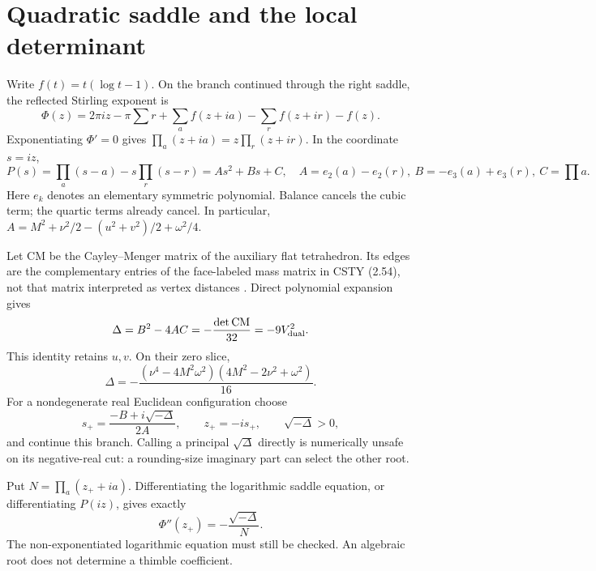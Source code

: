 \documentclass[11pt,a4paper]{article}
\begin{document}
\section{Quadratic saddle and the local determinant}
Write \(f(t)=t(\log t-1)\). On the branch continued through the right
saddle, the reflected Stirling exponent is
\begin{equation}
 \Phi(z)=2\pi iz-\pi\sum r+
 \sum_a f(z+ia)-\sum_r f(z+ir)-f(z).
 \label{eq:phi}
\end{equation}
Exponentiating \(\Phi'=0\) gives
\(\prod_a(z+ia)=z\prod_r(z+ir)\). In the coordinate \(s=iz\),
\begin{equation}
 P(s)=\prod_a(s-a)-s\prod_r(s-r)=As^2+Bs+C,\quad
 A=e_2(a)-e_2(r),\ B=-e_3(a)+e_3(r),\ C=\prod a.
 \label{eq:poly}
\end{equation}
Here \(e_k\) denotes an elementary symmetric polynomial. Balance
cancels the cubic term; the quartic terms already cancel. In particular,
\(A=M^2+\nu^2/2-(u^2+v^2)/2+\omega^2/4\).

Let \(\mathrm{CM}\) be the Cayley--Menger matrix of the auxiliary
flat tetrahedron. Its edges are the complementary entries of the
face-labeled mass matrix in CSTY (2.54), not that matrix interpreted
as vertex distances \cite{CSTY}. Direct polynomial expansion gives
\begin{equation}
 \Delta=B^2-4AC=-\frac{\det\mathrm{CM}}{32}
              =-9V_{\rm dual}^2.
 \label{eq:CM}
\end{equation}
This identity retains \(u,v\). On their zero slice,
\begin{equation}
 \Delta=-\frac{(\nu^4-4M^2\omega^2)
                    (4M^2-2\nu^2+\omega^2)}{16}.
 \label{eq:delta}
\end{equation}
For a nondegenerate real Euclidean configuration choose
\[
 s_+=\frac{-B+i\sqrt{-\Delta}}{2A},\qquad z_+=-is_+,
 \qquad \sqrt{-\Delta}>0,
\]
and continue this branch. Calling a principal \(\sqrt{\Delta}\)
directly is numerically unsafe on its negative-real cut:
a rounding-size imaginary part can select the other root.

Put \(N=\prod_a(z_++ia)\). Differentiating the logarithmic saddle
equation, or differentiating \(P(iz)\), gives exactly
\begin{equation}
 \Phi''(z_+)=-\frac{\sqrt{-\Delta}}{N}.
 \label{eq:curv}
\end{equation}
The non-exponentiated logarithmic equation must still be checked.
An algebraic root does not determine a thimble coefficient.
\end{document}
